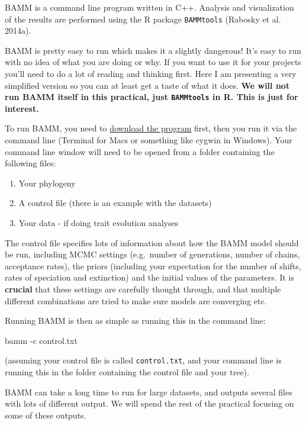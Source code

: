 \documentclass[]{book}
\newenvironment{Shaded}{\begin{snugshade}}{\end{snugshade}}
\newcommand{\NormalTok}[1]{{#1}}
\providecommand{\tightlist}{%
  \setlength{\itemsep}{0pt}\setlength{\parskip}{0pt}}
\theoremstyle{definition}
\theoremstyle{definition}
\theoremstyle{definition}
\theoremstyle{remark}
\begin{document}
BAMM is a command line program written in C++. Analysis and
visualization of the results are performed using the R package
\texttt{BAMMtools} (Rabosky et al. 2014a).

BAMM is pretty easy to run which makes it a slightly dangerous! It's
easy to run with no idea of what you are doing or why. If you want to
use it for your projects you'll need to do a lot of reading and thinking
first. Here I am presenting a very simplified version so you can at
least get a taste of what it does. \textbf{We will not run BAMM itself
in this practical, just \texttt{BAMMtools} in R. This is just for
interest.}

To run BAMM, you need to
\href{http://bamm-project.org/download.html}{download the program}
first, then you run it via the command line (Terminal for Macs or
something like cygwin in Windows). Your command line window will need to
be opened from a folder containing the following files:

\begin{enumerate}
\def\labelenumi{\arabic{enumi}.}
\tightlist
\item
  Your phylogeny
\item
  A control file (there is an example with the datasets)
\item
  Your data - if doing trait evolution analyses
\end{enumerate}

The control file specifies lots of information about how the BAMM model
should be run, including MCMC settings (e.g.~number of generations,
number of chains, acceptance rates), the priors (including your
expectation for the number of shifts, rates of speciation and
extinction) and the initial values of the parameters. It is
\textbf{crucial} that these settings are carefully thought through, and
that multiple different combinations are tried to make sure models are
converging etc.

Running BAMM is then as simple as running this in the command line:

\begin{Shaded}
\begin{Highlighting}[]
\NormalTok{bamm -c control.txt}
\end{Highlighting}
\end{Shaded}

(assuming your control file is called \texttt{control.txt}, and your
command line is running this in the folder containing the control file
and your tree).

BAMM can take a long time to run for large datasets, and outputs several
files with lots of different output. We will spend the rest of the
practical focusing on some of these outputs.
\end{document}

